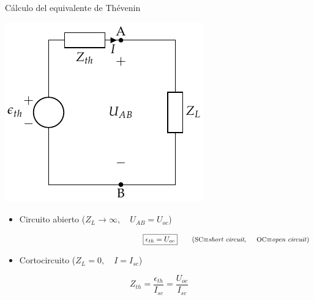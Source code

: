 \documentclass[aspectratio=169, usenames,svgnames,dvipsnames]{beamer}
\begin{document}
\begin{frame}{Cálculo del equivalente de Thévenin}
    \vspace{2mm}
    \begin{center}
        \includegraphics[height=0.43\textheight]{../figs/EquivalenteThevenin0.pdf}
    \end{center}
    
    \begin{itemize}
        \item Circuito abierto (\(Z_L \to \infty, \quad U_{AB} = U_{oc}\))
    \end{itemize}
    
    \vspace{-5mm}
    \[
        \hspace{65mm}
        \boxed{\epsilon_{th} = U_{oc}} 
        \qquad \textrm{(\small{SC$\equiv$\textit{short circuit}, \hspace*{4mm}OC$\equiv$\textit{open circuit}})}
    \] 
    
    \vspace{-1mm}
    \begin{itemize}
        \item Cortocircuito (\(Z_L = 0, \quad I = I_{sc}\))
    \end{itemize}
    \[
        \boxed{Z_{th} = \frac{\epsilon_{th}}{I_{sc}} = \frac{U_{oc}}{I_{sc}}}
    \]
\end{frame}

\end{document}
